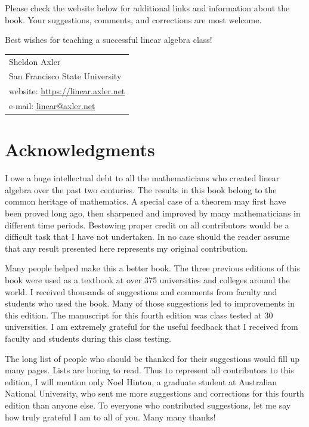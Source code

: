 Please check the website below for additional links and information about the
book. Your suggestions, comments, and corrections are most welcome.

Best wishes for teaching a successful linear algebra class!

%
\medskip
\noindent\begin{tabular}{@{}l@{}}
Sheldon Axler\\
San Francisco State University\\[3pt]
website: \url{https://linear.axler.net}\\
e-mail: \href{mailto:linear@axler.net}{linear@axler.net}
\end{tabular}

\chapter*{Acknowledgments}

I owe a huge intellectual debt to all the mathematicians who created linear
algebra over the past two centuries. The results in this book belong to the
common heritage of mathematics. A special case of a theorem may first have been
proved long ago, then sharpened and improved by many mathematicians in
different time periods. Bestowing proper credit on all contributors would be a
difficult task that I have not undertaken. In no case should the reader assume
that any result presented here represents my original contribution.

Many people helped make this a better book. The three previous editions of
this book were used as a textbook at over 375 universities and colleges around
the world. I received thousands of suggestions and comments from faculty and
students who used the book. Many of those suggestions led to improvements in
this edition. The manuscript for this fourth edition was class tested at 30
universities. I am extremely grateful for the useful feedback that I received
from faculty and students during this class testing.

The long list of people who should be thanked for their suggestions would fill
up many pages. Lists are boring to read. Thus to represent all contributors to
this edition, I will mention only Noel Hinton, a graduate student at Australian
National University, who sent me more suggestions and corrections for this
fourth edition than anyone else. To everyone who contributed suggestions, let
me say how truly grateful I am to all of you. Many many thanks!

